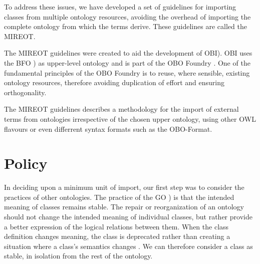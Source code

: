 \documentclass[a4paper,10pt,twocolumn]{article}
\begin{document}

To address these issues, we have developed a set of guidelines for importing classes from multiple ontology resources, avoiding the overhead of importing the complete ontology from which the terms derive. These guidelines are called the \ac{MIREOT}.


The \ac{MIREOT} guidelines were created to aid the development of \ac{OBI}\cite{RefWorks:1507}).
\ac{OBI} uses the \ac{BFO} \cite{RefWorks:1557}) as upper-level ontology and is part of the \ac{OBO} Foundry \cite{RefWorks:1472}. 
One of the fundamental principles of the \ac{OBO} Foundry is to reuse, where sensible, existing ontology resources, therefore avoiding duplication of effort and ensuring orthogonality.


The \ac{MIREOT} guidelines describes a methodology for the import of external terms from ontologies irrespective of the chosen upper ontology, using other \ac{OWL} flavours or even differrent syntax formats such as the \ac{OBO}-Format.
\section*{Policy}

In deciding upon a minimum unit of import, our first step was to consider the practices of other ontologies.
The practice of the \ac{GO} \cite{RefWorks:79}) is that the intended meaning of classes remains stable.
The repair or reorganization of an ontology should not change the intended meaning of individual classes, but rather provide a better expression of the logical relations between them.
When the class definition changes meaning, the class is deprecated rather than creating a situation where a class's semantics changes \cite{RefWorks:1560}.
We can therefore consider a class as stable, in isolation from the rest of the ontology. 

\end{document}
